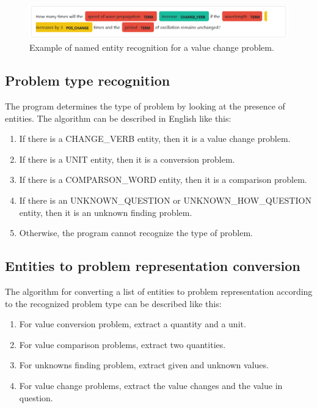 \documentclass[a4paper, 12pt]{article}
\begin{document}
	\begin{figure}[h]
		\centering
		\includegraphics[width=\textwidth]{media/image4.png}
		\caption{Example of named entity recognition for a value change problem.}
	\end{figure}
	
	\subsection{Problem type recognition}
	
	The program determines the type of problem by looking at the presence of
	entities. The algorithm can be described in English like this:
	
	\begin{enumerate}
	\item
	  If there is a CHANGE\_VERB entity, then it is a value change problem.
	\item
	  If there is a UNIT entity, then it is a conversion problem.
	\item
	  If there is a COMPARSON\_WORD entity, then it is a comparison problem.
	\item
	  If there is an UNKNOWN\_QUESTION or UNKNOWN\_HOW\_QUESTION entity,
	  then it is an unknown finding problem.
	\item
	  Otherwise, the program cannot recognize the type of problem.
	\end{enumerate}
	
	\subsection{Entities to problem representation conversion}
	
	The algorithm for converting a list of entities to problem
	representation according to the recognized problem type can be described
	like this:
	
	\begin{enumerate}
	\item
	  For value conversion problem, extract a quantity and a unit.
	\item
	  For value comparison problems, extract two quantities.
	\item
	  For unknowns finding problem, extract given and unknown values.
	\item
	  For value change problems, extract the value changes and the value in
	  question.
	\end{enumerate}
	
\end{document}
